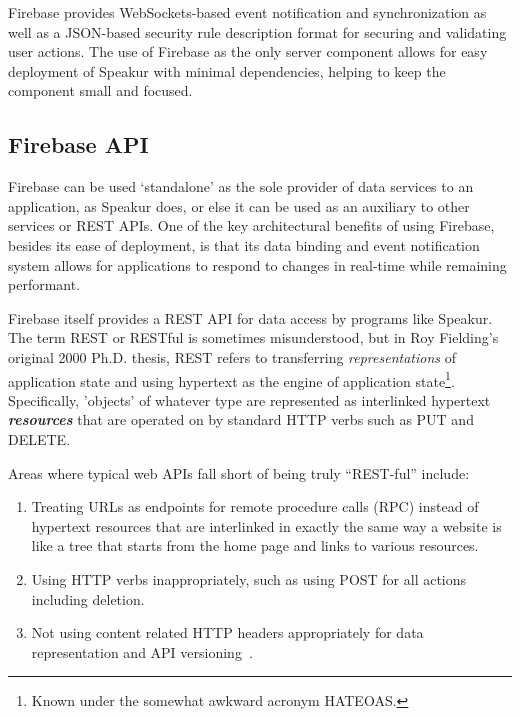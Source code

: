 Firebase provides WebSockets-based event notification and synchronization 
as well as a JSON-based security rule description format for securing and validating user actions.
The use of Firebase as the only server component allows for easy deployment of Speakur with minimal dependencies, helping to keep the component small and focused.

\subsection{Firebase API}
Firebase can be used `standalone' as the sole provider of data services to an application, as Speakur does, or else it can be used as an auxiliary to other services or REST APIs.
One of the key architectural benefits of using Firebase, 
besides its ease of deployment, 
is that its data binding and event notification system allows for 
applications to respond to changes in real-time while remaining performant.

Firebase itself provides a REST API for data access by programs like Speakur.
The term REST or RESTful is sometimes misunderstood,
but in Roy Fielding's original 2000 Ph.D. thesis, 
REST refers to transferring \textit{representations} of application state and using hypertext as the engine of 
application state\footnote{Known under the somewhat awkward acronym HATEOAS.}.
Specifically, 'objects' of whatever type are represented as interlinked hypertext \textbf{\textit{resources}} that are operated on by standard HTTP verbs such as PUT and DELETE.

Areas where typical web APIs fall short of being truly ``REST-ful'' include:
\begin{enumerate}
\item Treating URLs as endpoints for remote procedure calls (RPC) instead of hypertext resources that are interlinked in exactly the same way a website is like a tree that starts from the home page and links to various resources.
\item Using HTTP verbs inappropriately, such as using POST for all actions including deletion.
\item Not using content related HTTP headers appropriately for data representation and API versioning~\cite{steveklabnik2011}.
\end{enumerate}

